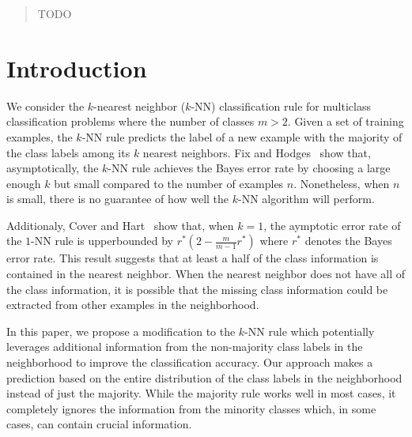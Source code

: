 \documentclass{article}
\begin{document}
 


\begin{abstract} 
TODO
\end{abstract} 

\section{Introduction}
\label{sec:intro}

We consider the $k$-nearest neighbor ($k$-NN) classification rule for
multiclass classification problems where the number of classes $m >
2$. Given a set of training examples, the $k$-NN rule predicts the
label of a new example with the majority of the class labels among its
$k$ nearest neighbors. Fix and Hodges~\cite{Fix1951} show that,
asymptotically, the $k$-NN rule achieves the Bayes error rate by
choosing a large enough $k$ but small compared to the number of
examples $n$. Nonetheless, when $n$ is small, there is no guarantee of
how well the $k$-NN algorithm will perform. 

Additionaly, Cover and Hart~\cite{Cover1967} show that, when $k = 1$,
the aymptotic error rate of the $1$-NN rule is upperbounded by $r^*(2
- \frac{m}{m-1}r^*)$ where $r^*$ denotes the Bayes error rate. This
result suggests that at least a half of the class information is
contained in the nearest neighbor. When the nearest neighbor does not
have all of the class information, it is possible that the missing
class information could be extracted from other examples in the
neighborhood.

In this paper, we propose a modification to the $k$-NN rule which
potentially leverages additional information from the non-majority
class labels in the neighborhood to improve the classification
accuracy. Our approach makes a prediction based on the entire
distribution of the class labels in the neighborhood instead of just
the majority. While the majority rule works well in most cases, it
completely ignores the information from the minority classes which, in
some cases, can contain crucial information.
\end{document}
